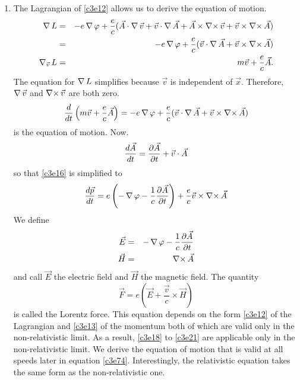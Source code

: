 \begin{enumerate}
\item The Lagrangian of \eqref{c3e12} allows us to derive the equation of 
motion.
\begin{eqnarray*}
\operatorname{\nabla} L &=& -e\operatorname{\nabla}\varphi + \frac{e}{c}(\vec{A}\cdot\operatorname{\nabla}\vec{v} + 
 \vec{v}\cdot\operatorname{\nabla}\vec{A} + \vec{A}\times\operatorname{\nabla\times}\vec{v} + 
 \vec{v}\times\operatorname{\nabla\times}\vec{A})\\ 
 &=& -e\operatorname{\nabla}\varphi + \frac{e}{c}(\vec{v}\cdot\operatorname{\nabla}\vec{A} + 
 \vec{v}\times\operatorname{\nabla\times}\vec{A})\\ 
\operatorname{\nabla}_{\vec{v}}L &=& m\vec{v} + \frac{e}{c}\vec{A}.
\end{eqnarray*}
The equation for $\operatorname{\nabla} L$ simplifies because $\vec{v}$ is independent of 
$\vec{x}$.  Therefore, $\operatorname{\nabla}\vec{v}$ and $\operatorname{\nabla\times}\vec{v}$ are both zero.
\begin{equation}\label{c3e16}
\frac{d}{dt}\left(m\vec{v} + \frac{e}{c}\vec{A}\right) = 
-e\operatorname{\nabla}\varphi + \frac{e}{c}(\vec{v}\cdot\operatorname{\nabla}\vec{A} + 
\vec{v}\times\operatorname{\nabla\times}\vec{A})
\end{equation}
is the equation of motion. Now.
\begin{equation}\label{c3e17}
\frac{d{\vec{A}}}{d{t}} = \frac{\partial{\vec{A}}}{\partial{t}} + \vec{v}\cdot\vec{A}
\end{equation}
so that \eqref{c3e16} is simplified to
\begin{equation}\label{c3e18}
\frac{d{\vec{p}}}{d{t}} = e\left(-\operatorname{\nabla}\varphi - \frac{1}{c}\frac{\partial{\vec{A}}}{\partial{t}}\right)
+ \frac{e}{c}\vec{v}\times\operatorname{\nabla\times}\vec{A}
\end{equation}
We define
\begin{eqnarray}
\vec{E} &=& -\operatorname{\nabla}\varphi - \frac{1}{c}\frac{\partial{\vec{A}}}{\partial{t}} \label{c3e19} \\
\vec{H} &=& \operatorname{\nabla\times}\vec{A} \label{c3e20}
\end{eqnarray}
and call $\vec{E}$ the electric field and $\vec{H}$ the magnetic field. The
quantity
\begin{equation}\label{c3e21}
\vec{F} = e\left(\vec{E} + \frac{\vec{v}}{c}\times\vec{H}\right)
\end{equation}
is called the Lorentz force. This equation depends on the form \eqref{c3e12} of
the Lagrangian and \eqref{c3e13} of the momentum both of which are valid only in
the non-relativistic limit. As a result, \eqref{c3e18} to \eqref{c3e21} are 
applicable only in the non-relativistic limit. We derive the equation of motion
that is valid at all speeds later in equation \eqref{c3e74}. Interestingly, the
relativistic equation takes the same form as the non-relativistic one.


\end{enumerate}
